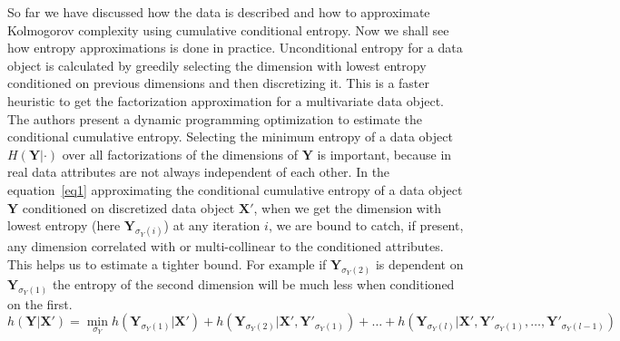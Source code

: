 \documentclass[10pt]{article}
\begin{document}
\par So far we have discussed how the data is described and how to approximate Kolmogorov complexity using cumulative conditional entropy. Now we shall see how entropy approximations is done in practice. Unconditional entropy for a data object is calculated by greedily selecting the dimension with lowest entropy conditioned on previous dimensions and then discretizing it. This is a faster heuristic to get the factorization approximation for a multivariate data object. The authors present a dynamic programming optimization to estimate the conditional cumulative entropy. Selecting the minimum entropy of a data object $H(\mathbf{Y}|\cdot)$ over all factorizations of the dimensions of $\mathbf{Y}$ is important, because in real data attributes are not always independent of each other. In the equation~\eqref{eq1} approximating the conditional cumulative entropy of a data object $\mathbf{Y}$ conditioned on discretized data object $\mathbf{X'}$, when we get the dimension with lowest entropy (here $\mathbf{Y}_{\sigma_Y(i)}$) at any iteration $i$, we are bound to catch, if present, any dimension correlated with or multi-collinear to the conditioned attributes. This helps us to estimate a tighter bound. For example if $\mathbf{Y}_{\sigma_Y(2)}$ is dependent on $\mathbf{Y}_{\sigma_Y(1)}$ the entropy of the second dimension will be much less when conditioned on the first.
\begin{equation}\label{eq1}
h(\mathbf{Y}|\mathbf{X}') = \min_{\sigma_Y} h(\mathbf{Y}_{\sigma_Y(1)}|\mathbf{X}') + h(\mathbf{Y}_{\sigma_Y(2)}|\mathbf{X}', \mathbf{Y'}_{\sigma_Y(1)}) + \ldots + h(\mathbf{Y}_{\sigma_Y(l)}|\mathbf{X}', \mathbf{Y'}_{\sigma_Y(1)}, \ldots , \mathbf{Y'}_{\sigma_Y(l-1)}) 
\end{equation}


\end{document}
